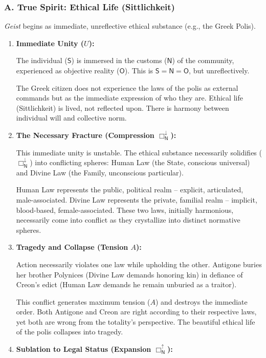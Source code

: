 \documentclass[12pt]{book}
\newcommand{\NBoxUp}{\Box_{\mathsf{N}}^{\uparrow}}
\newcommand{\NBoxDown}{\Box_{\mathsf{N}}^{\downarrow}}
\begin{document}
\subsubsection{A. True Spirit: Ethical Life (Sittlichkeit)}

\textit{Geist} begins as immediate, unreflective ethical substance (e.g., the Greek Polis).

\begin{enumerate}
\item \textbf{Immediate Unity ($U$):}

The individual ($\mathsf{S}$) is immersed in the customs ($\mathsf{N}$) of the community, experienced as objective reality ($\mathsf{O}$). This is $\mathsf{S}=\mathsf{N}=\mathsf{O}$, but unreflectively.

The Greek citizen does not experience the laws of the polis as external commands but as the immediate expression of who they are. Ethical life (Sittlichkeit) is lived, not reflected upon. There is harmony between individual will and collective norm.

\item \textbf{The Necessary Fracture (Compression $\NBoxDown$):}

This immediate unity is unstable. The ethical substance necessarily solidifies ($\NBoxDown$) into conflicting spheres: Human Law (the State, conscious universal) and Divine Law (the Family, unconscious particular).

Human Law represents the public, political realm -- explicit, articulated, male-associated. Divine Law represents the private, familial realm -- implicit, blood-based, female-associated. These two laws, initially harmonious, necessarily come into conflict as they crystallize into distinct normative spheres.

\item \textbf{Tragedy and Collapse (Tension $A$):}

Action necessarily violates one law while upholding the other. Antigone buries her brother Polynices (Divine Law demands honoring kin) in defiance of Creon's edict (Human Law demands he remain unburied as a traitor).

This conflict generates maximum tension ($A$) and destroys the immediate order. Both Antigone and Creon are right according to their respective laws, yet both are wrong from the totality's perspective. The beautiful ethical life of the polis collapses into tragedy.

\item \textbf{Sublation to Legal Status (Expansion $\NBoxUp$):}


\end{enumerate}
\end{document}
